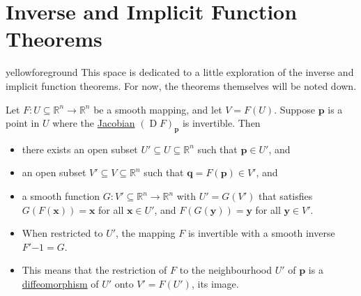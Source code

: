 \documentclass[notoc,notitlepage]{tufte-book}
\DeclareMathOperator{\D}{D}
\begin{document}

\section{Inverse and Implicit Function Theorems}%
\label{sec:inverse_and_implicit_function_theorems}

\begin{quotebox}{yellow}{foreground}
  This space is dedicated to a little exploration of the inverse and implicit
  function theorems. For now, the theorems themselves will be noted down.
\end{quotebox}

\begin{thm}\label{thm:inverse_function_theorem}
  Let $F : U \subseteq \mathbb{R}^n \to \mathbb{R}^n$ be a smooth mapping, and
  let $V = F(U)$. Suppose $\bm{p}$ is a point in $U$ where the
  \hyperref[defn:differential]{Jacobian} $(\D F)_{\bm{p}}$ is invertible. Then
  \begin{itemize}
    \item there exists an open subset $U' \subseteq U \subseteq \mathbb{R}^n$
      such that $\bm{p} \in U'$, and
    \item an open subset $V' \subseteq V \subseteq \mathbb{R}^n$ such that
      $\bm{q} = F(\bm{p}) \in V'$, and
    \item a smooth function $G : V' \subseteq \mathbb{R}^n \to \mathbb{R}^n$
      with $U' = G(V')$ that satisfies $G(F(\bm{x})) = \bm{x}$ for all $\bm{x}
      \in U'$, and $F(G(\bm{y})) = \bm{y}$ for all $\bm{y} \in V'$.
  \end{itemize}
\end{thm}

\begin{note}
  \begin{itemize}
    \item When restricted to $U'$, the mapping $F$ is invertible with a smooth
      inverse $F'{-1} = G$.
    \item This means that the restriction of $F$ to the neighbourhood $U'$ of
      $\bm{p}$ is a \hyperref[defn:diffeomorphism]{diffeomorphism} of $U'$ onto
      $V' = F(U')$, its image.
  \end{itemize}
\end{note}
\end{document}
